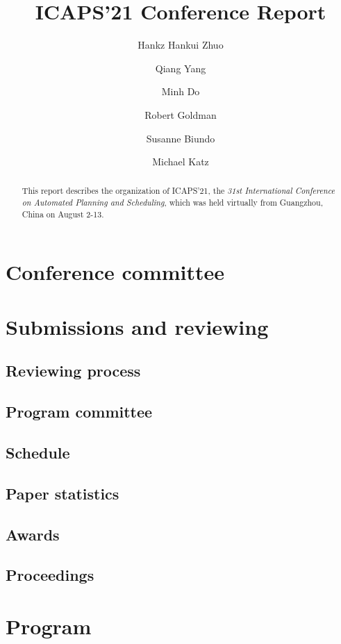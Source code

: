 \documentclass[11pt,a4paper]{article}
\begin{document}
\author{Hankz Hankui Zhuo \and Qiang Yang \and Minh Do \and  Robert Goldman \and Susanne Biundo \and Michael Katz
}
\title{ICAPS'21 Conference Report}

\maketitle

\begin{abstract}
This report describes the organization of ICAPS'21,
the {\em 31st International Conference on Automated Planning and Scheduling},
which was held virtually from Guangzhou, China 
on August 2-13.
\end{abstract}

\parskip-2pt
\tableofcontents
\parskip4pt

\newpage

\section{Conference committee}

\section{Submissions and reviewing}
\subsection{Reviewing process}
\subsection{Program committee}
\subsection{Schedule}
\subsection{Paper statistics}\label{se:submissionstatistics}
\subsection{Awards}\label{se:bestpapers}
\subsection{Proceedings}

\section{Program}
\end{document}
